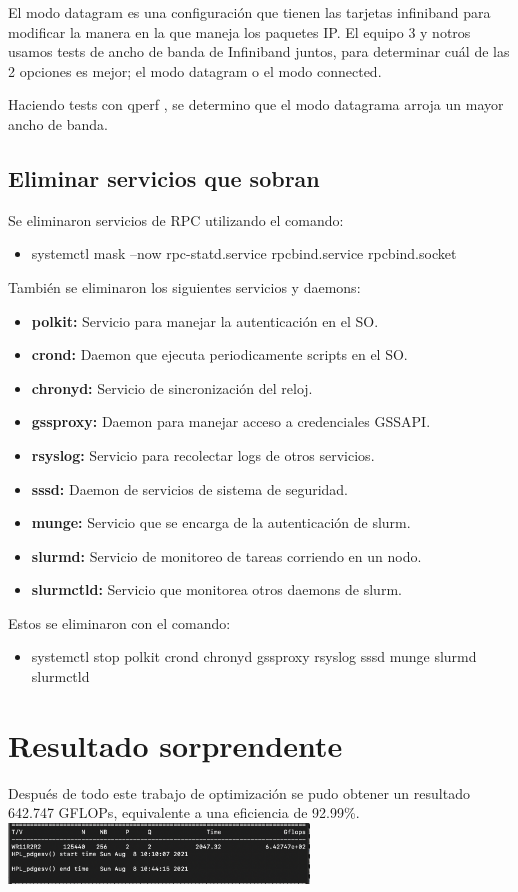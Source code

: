 \documentclass[conference,compsoc]{IEEEtran}
\begin{document}
El modo datagram es una configuración que tienen las tarjetas infiniband para modificar la manera en la que maneja los paquetes IP. El equipo 3 y notros usamos tests de ancho de banda de Infiniband juntos, para determinar cuál de las 2 opciones es mejor; el modo datagram o el modo connected. 

Haciendo tests con qperf \cite{tutorial-qperf}, se determino que el modo datagrama arroja un mayor ancho de banda.

\subsection{Eliminar servicios que sobran}

Se eliminaron servicios de RPC utilizando el comando:
\begin{itemize}
    \item systemctl mask --now rpc-statd.service rpcbind.service rpcbind.socket
\end{itemize}
También se eliminaron los siguientes servicios y daemons:
\begin{itemize}
    \item \textbf{polkit:} Servicio para manejar la autenticación en el SO.
    \item \textbf{crond:} Daemon que ejecuta periodicamente scripts en el SO.
    \item \textbf{chronyd:} Servicio de sincronización del reloj.
    \item \textbf{gssproxy:} Daemon para manejar acceso a credenciales GSSAPI.
    \item \textbf{rsyslog:} Servicio para recolectar logs de otros servicios.
    \item \textbf{sssd:} Daemon de servicios de sistema de seguridad.
    \item \textbf{munge:} Servicio que se encarga de la autenticación de slurm.
    \item \textbf{slurmd:} Servicio de monitoreo de tareas corriendo en un nodo.
    \item \textbf{slurmctld:} Servicio que monitorea otros daemons de slurm.
\end{itemize}
Estos se eliminaron con el comando:
\begin{itemize}
    \item systemctl stop polkit crond chronyd gssproxy rsyslog sssd munge slurmd slurmctld
\end{itemize}

\section{Resultado sorprendente}

Después de todo este trabajo de optimización se pudo obtener un resultado 642.747 GFLOPs, equivalente a una eficiencia de 92.99\%.\\

\includegraphics[width=8cm]{GFLOPS642.png}



\end{document}
